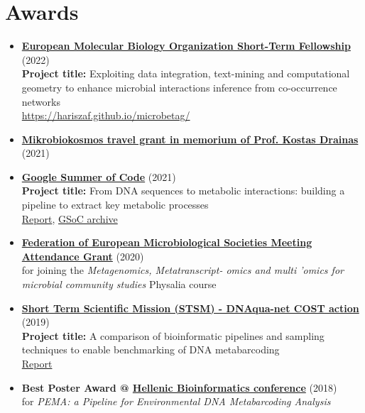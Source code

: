 \section*{Awards}

\begin{itemize}

   \item{
      \textbf{\href{https://www.embo.org/funding/fellowships-grants-and-career-support/scientific-exchange-grants/}{European Molecular Biology Organization Short-Term Fellowship}} (2022) \\ 
      \textbf{Project title:} Exploiting data integration, text-mining and computational geometry to enhance microbial interactions inference from  co-occurrence networks \\
      \href{Report}{https://hariszaf.github.io/microbetag/}

   }

   \item{
      \textbf{\href{https://www.mikrobiokosmos2021.org/}{Mikrobiokosmos travel grant in memorium of Prof. Kostas Drainas}} (2021) 
   }

   \item{
      \textbf{\href{https://summerofcode.withgoogle.com/}{Google Summer of Code}} (2021) \\
      \textbf{Project title:} From DNA sequences to metabolic interactions: building a pipeline to extract key metabolic processes \\
      \href{https://summerofcode.withgoogle.com/archive/2021/projects/6407348884602880}{Report}, \href{https://hariszaf.github.io/gsoc2021/}{GSoC archive}
   }

   \item{
      \textbf{\href{https://fems-microbiology.org/}{Federation of European Microbiological Societies Meeting Attendance Grant}} (2020) \\ 
      for joining the \textit{Metagenomics, Metatranscript- omics and multi 'omics for microbial community studies} Physalia course

   }

   \item{
      \textbf{\href{https://dnaqua.net/stsms/}{Short Term Scientific Mission (STSM) - DNAqua-net COST action}} (2019) \\
      \textbf{Project title:} 
      A comparison of bioinformatic pipelines and sampling techniques to enable benchmarking of DNA metabarcoding \\
      \href{http://dnaqua.net/wp-content/uploads/2019/08/Zafeiropoulos.pdf}{Report}
   }

   \item{
      \textbf{Best Poster Award @ \href{https://hscbio.wordpress.com/}{Hellenic Bioinformatics conference}} (2018) \\
      for \textit{PEMA: a Pipeline for Environmental DNA Metabarcoding Analysis}
   }

\end{itemize}


